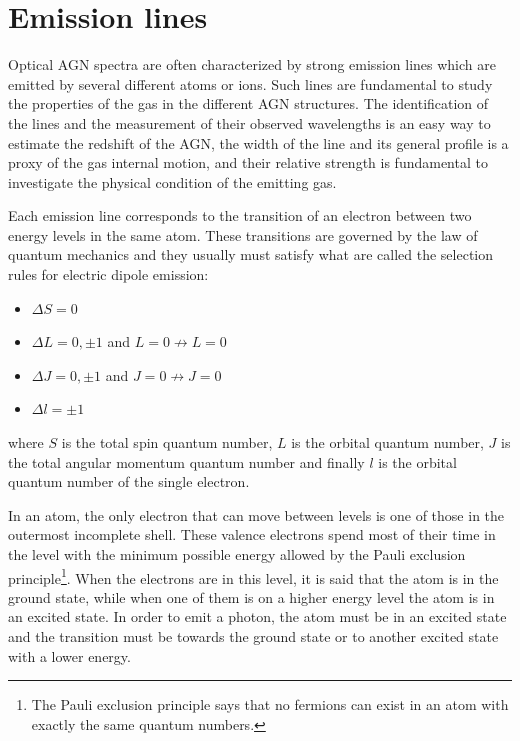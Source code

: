 \documentclass[../main.tex]{subfiles}
\begin{document}
\clearpage 
\section{Emission lines}
\label{sec:emission_line}

Optical AGN spectra are often characterized by strong emission lines which are emitted by several different atoms or ions.
Such lines are fundamental to study the properties of the gas in the different AGN structures.
The identification of the lines and the measurement of their observed wavelengths is an easy way to estimate the redshift of the AGN, the width of the line and its general profile is a proxy of the gas internal motion, and their relative strength is fundamental to investigate the physical condition of the emitting gas.

Each emission line corresponds to the transition of an electron between two energy levels in the same atom.
These transitions are governed by the law of quantum mechanics and they usually must satisfy what are called the selection rules for electric dipole emission:
\begin{itemize}
    \item $\Delta S = 0$
    \item $\Delta L = 0,\pm1$ and $L =0 \not\to L=0$
    \item $\Delta J = 0, \pm 1$ and $J=0 \not\to J=0$
    \item $\Delta l = \pm 1$
\end{itemize}
where $S$ is the total spin quantum number, $L$ is the orbital quantum number, $J$ is the total angular momentum quantum number and finally $l$ is the orbital quantum number of the single electron. 

In an atom, the only electron that can move between levels is one of those in the outermost incomplete shell. 
These valence electrons spend most of their time in the level with the minimum possible energy allowed by the Pauli exclusion principle\footnote{The Pauli exclusion principle says that no fermions can exist in an atom with exactly the same quantum numbers.}.
When the electrons are in this level, it is said that the atom is in the ground state, while when one of them is on a higher energy level the atom is in an excited state.
In order to emit a photon, the atom must be in an excited state and the transition must be towards the ground state or to another excited state with a lower energy.
\end{document}
